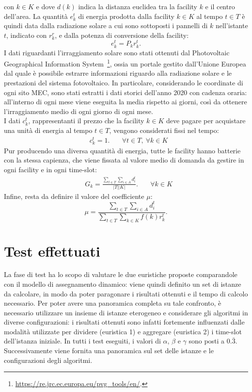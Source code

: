 con $k \in K$ e dove $d(k)$ indica la distanza euclidea tra la facility $k$ e il centro dell'area.
La quantità $e^t_k$ di energia prodotta dalla facility $k \in K$ al tempo $t \in T$ è quindi data dalla radiazione solare a cui sono sottoposti i pannelli di $k$ nell'istante $t$, indicato con $r^r_k$, e dalla potenza di conversione della facility:
\begin{equation}
    e^t_k = P_k r^t_k.
\end{equation}
I dati riguardanti l'irraggiamento solare sono stati ottenuti dal Photovoltaic Geographical Information System~\footnote{\url{https://re.jrc.ec.europa.eu/pvg_tools/en/}.}, ossia un portale gestito dall'Unione Europea dal quale è possibile estrarre informazioni riguardo alla radiazione solare e le prestazioni del sistema fotovoltaico. In particolare, considerando le coordinate di ogni sito MEC, sono stati estratti i dati storici dell'anno 2020 con cadenza oraria: all'interno di ogni mese viene eseguita la media rispetto ai giorni, così da ottenere l'irraggiamento medio di ogni giorno di ogni mese.\\
I dati $c^t_k$, rappresentanti il prezzo che la facility $k \in K$ deve pagare per acquistare una unità di energia al tempo $t \in T$, vengono considerati fissi nel tempo:
\begin{align}
    &c^t_k = 1. && ~ \forall t \in T, ~ \forall k \in K
\end{align}
Pur producendo una diversa quantità di energia, tutte le facility hanno batterie con la stessa capienza, che viene fissata al valore medio di domanda da gestire in ogni facility e in ogni time-slot:
\begin{align}
    &G_k = \frac{\sum_{t \in T} \sum_{i \in A} d^t_i}{|T||K|}. && ~ \forall k \in K
\end{align}
Infine, resta da definire il valore del coefficiente $\mu$:
\begin{equation}
    \mu = \frac{\sum_{t \in T} \sum_{i \in A} d^t_i}{\sum_{t \in T} \sum_{k \in K} f(k)r^t_k}.
\end{equation}


%
%
\section{Test effettuati}
\label{sec:test}

La fase di test ha lo scopo di valutare le due euristiche proposte comparandole con il modello di assegnamento dinamico: viene quindi definito un set di istanze da calcolare, in modo da poter paragonare i risultati ottenuti e il tempo di calcolo necessario. Per poter avere una panoramica completa su tale confronto, è necessario utilizzare un insieme di istanze eterogeneo e considerare gli algoritmi in diverse configurazioni: i risultati ottenuti sono infatti fortemente influenzati dalle modalità utilizzate per dividere (euristica 1) e aggregare (euristica 2) i time-slot dell'istanza iniziale. In tutti i test eseguiti, i valori di $\alpha$, $\beta$ e $\gamma$ sono posti a $0.\bar{3}$. Successivamente viene fornita una panoramica sul set delle istanze e le configurazioni degli algoritmi.


